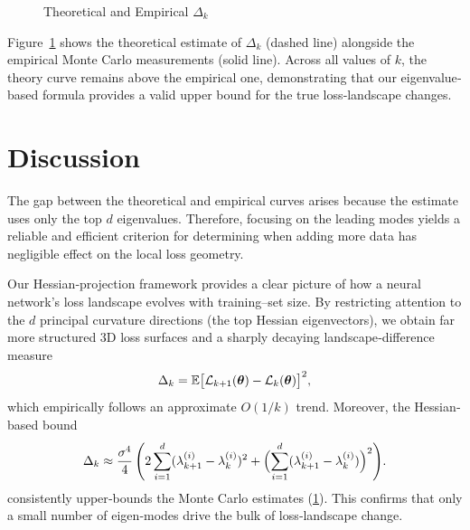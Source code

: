 \documentclass{article}
\begin{document}
\begin{figure}[!htbp]
  \caption{Theoretical and Empirical $\Delta_k$}
  \label{fig:delta_eigen_comparison}
\end{figure}

Figure~\ref{fig:delta_eigen_comparison} shows the theoretical estimate of $\Delta_k$ (dashed line) alongside the empirical Monte Carlo
measurements (solid line).  Across all values of $k$, the theory curve remains above the empirical one, demonstrating that our
eigenvalue‐based formula provides a valid upper bound for the true loss‐landscape changes.


\section{Discussion}\label{sec:disc}

The gap between the theoretical and empirical curves arises because the estimate uses only the top $d$ eigenvalues.
Therefore, focusing on the leading modes yields a reliable and efficient criterion for determining when
adding more data has negligible effect on the local loss geometry.

Our Hessian‐projection framework provides a clear picture of how a neural network’s loss landscape evolves with training–set size.
By restricting attention to the $d$ principal curvature directions (the top Hessian eigenvectors), we obtain far more structured 3D
loss surfaces and a sharply decaying landscape‐difference measure
$$
  \Delta_k =
  \mathbb{E} \bigl[ \mathcal{L}_{k+1}(\boldsymbol{\theta}) - \mathcal{L}_k(\boldsymbol{\theta}) \bigr]^2,
$$
which empirically follows an approximate $O(1/k)$ trend.  Moreover, the Hessian‐based bound
$$
  \Delta_k \approx
  \frac{\sigma^4}{4}\, \Biggl( 2 \sum_{i=1}^d (\lambda_{k+1}^{(i)} - \lambda_k^{(i)})^2
  + \Bigl( \sum_{i=1}^d (\lambda_{k+1}^{(i)} - \lambda_k^{(i)}) \Bigr)^2 \Biggr).
$$
consistently upper‐bounds the Monte Carlo estimates (\ref{fig:delta_eigen_comparison}). This confirms that only a small number of
eigen‐modes drive the bulk of loss‐landscape change.
\end{document}
